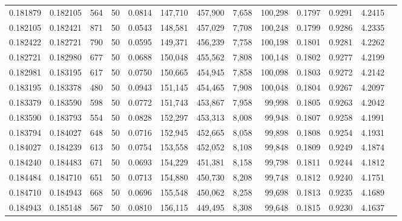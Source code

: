 \begin{tabular}{rrrrrrrrrrrrr}
0.181879 & 0.182105 &   564 &  50 &                                     0.0814 & 147,710 & 457,900 &   7,658 & 100,298 & 0.1797 & 0.9291 & 4.2415 \\
0.182105 & 0.182421 &   871 &  50 &                                     0.0543 & 148,581 & 457,029 &   7,708 & 100,248 & 0.1799 & 0.9286 & 4.2335 \\
0.182422 & 0.182721 &   790 &  50 &                                     0.0595 & 149,371 & 456,239 &   7,758 & 100,198 & 0.1801 & 0.9281 & 4.2262 \\
0.182721 & 0.182980 &   677 &  50 &                                     0.0688 & 150,048 & 455,562 &   7,808 & 100,148 & 0.1802 & 0.9277 & 4.2199 \\
0.182981 & 0.183195 &   617 &  50 &                                     0.0750 & 150,665 & 454,945 &   7,858 & 100,098 & 0.1803 & 0.9272 & 4.2142 \\
0.183195 & 0.183378 &   480 &  50 &                                     0.0943 & 151,145 & 454,465 &   7,908 & 100,048 & 0.1804 & 0.9267 & 4.2097 \\
0.183379 & 0.183590 &   598 &  50 &                                     0.0772 & 151,743 & 453,867 &   7,958 &  99,998 & 0.1805 & 0.9263 & 4.2042 \\
0.183590 & 0.183793 &   554 &  50 &                                     0.0828 & 152,297 & 453,313 &   8,008 &  99,948 & 0.1807 & 0.9258 & 4.1991 \\
0.183794 & 0.184027 &   648 &  50 &                                     0.0716 & 152,945 & 452,665 &   8,058 &  99,898 & 0.1808 & 0.9254 & 4.1931 \\
0.184027 & 0.184239 &   613 &  50 &                                     0.0754 & 153,558 & 452,052 &   8,108 &  99,848 & 0.1809 & 0.9249 & 4.1874 \\
0.184240 & 0.184483 &   671 &  50 &                                     0.0693 & 154,229 & 451,381 &   8,158 &  99,798 & 0.1811 & 0.9244 & 4.1812 \\
0.184484 & 0.184710 &   651 &  50 &                                     0.0713 & 154,880 & 450,730 &   8,208 &  99,748 & 0.1812 & 0.9240 & 4.1751 \\
0.184710 & 0.184943 &   668 &  50 &                                     0.0696 & 155,548 & 450,062 &   8,258 &  99,698 & 0.1813 & 0.9235 & 4.1689 \\
0.184943 & 0.185148 &   567 &  50 &                                     0.0810 & 156,115 & 449,495 &   8,308 &  99,648 & 0.1815 & 0.9230 & 4.1637 \\

\end{tabular}
